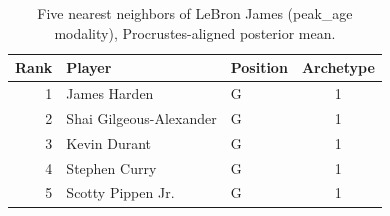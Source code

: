\begin{table}[htbp]
  \centering\small
  \begin{tabular}{rllc}
    \toprule
    Rank & Player & Position & Archetype \\
    \midrule
    1 & James Harden & G & 1 \\
    2 & Shai Gilgeous-Alexander & G & 1 \\
    3 & Kevin Durant & G & 1 \\
    4 & Stephen Curry & G & 1 \\
    5 & Scotty Pippen Jr. & G & 1 \\
    \bottomrule
  \end{tabular}
  \caption{Five nearest neighbors of LeBron James (peak_age modality), Procrustes-aligned posterior mean.}
  \label{tab:LeBron_James_neighbors_peak_age}
\end{table}

